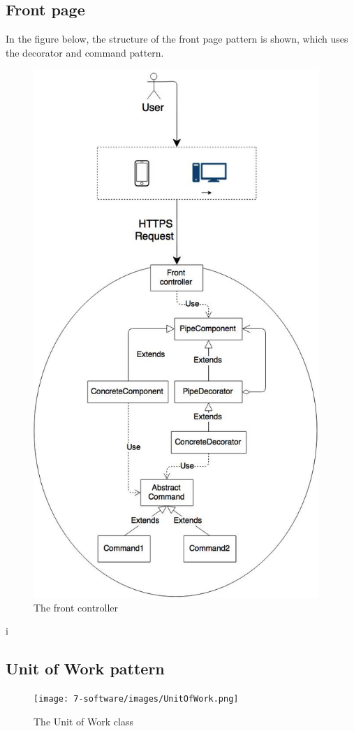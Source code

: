 \subsection{Front page}
In the figure below, the structure of the front page pattern is shown, which uses the decorator and command pattern.
\label{sec:unit-of-work-pattern}
\begin{figure}[H]
\centering
\includegraphics[scale=0.8, height=20cm]{7-software/images/frontPage.jpg}
\caption{The front controller}
\label{fig:frontcontroller}
\end{figure}
i

\subsection{Unit of Work pattern}
\label{sec:unit-of-work-pattern}
\begin{figure}[H]
\centering
\texttt{[image: 7-software/images/UnitOfWork.png]}
\caption{The Unit of Work class}
\label{fig:unitofworkclass}
\end{figure}

